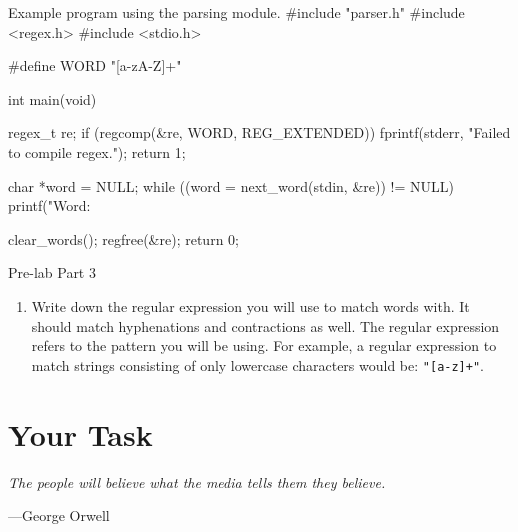\documentclass{article}
\begin{document}
\begin{codelisting}{Example program using the parsing module.}
#include "parser.h"
#include <regex.h>
#include <stdio.h>

#define WORD "[a-zA-Z]+"

int main(void) {
    regex_t re;
    if (regcomp(&re, WORD, REG_EXTENDED)) {
        fprintf(stderr, "Failed to compile regex.\n");
        return 1;
    }

    char *word = NULL;
    while ((word = next_word(stdin, &re)) != NULL) {
        printf("Word: %
    }

    clear_words();
    regfree(&re);
    return 0;
}
\end{codelisting}

\vspace{10pt}
\begin{prelab}{Pre-lab Part 3}
  \begin{enumerate}
    \item Write down the regular expression you will use to match words
      with. It should match hyphenations and contractions as well. The
      regular expression refers to the pattern you will be using. For
      example, a regular expression to match strings consisting of only
      lowercase characters would be: \texttt{"[a-z]+"}.
  \end{enumerate}
\end{prelab}


\section{Your Task}

\epigraph{\emph{The people will believe what the media tells them they
believe.}}{---George Orwell}
\end{document}
